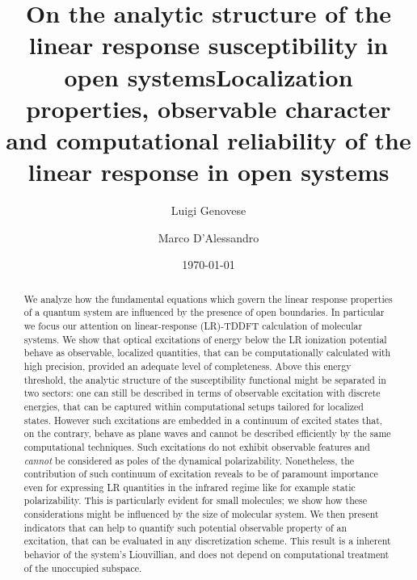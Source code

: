 \documentclass[reprint,aps,prb]{revtex4-1}
\begin{document}

\title{On the analytic structure of the linear response susceptibility in open systems}
\title{Localization properties, observable character and computational reliability of the linear response in open systems}

\author{Luigi Genovese}
\author{Marco D'Alessandro}%

\date{\today}

\begin{abstract}
We analyze how the fundamental equations which govern the linear response properties of a quantum system are influenced by the presence of open boundaries.
In particular we focus our attention on linear-response (LR)-TDDFT calculation of molecular systems. We show that optical excitations of energy below the LR ionization potential 
behave as observable, localized quantities, that can be computationally calculated with high precision, provided an adequate level of completeness.
Above this energy threshold, the analytic structure of the susceptibility functional might be separated in two sectors: one can still be described in terms of observable excitation 
with discrete energies, that can be captured within computational setups tailored for localized states. However such excitations are embedded in a continuum of excited states 
that, on the contrary, behave as plane waves and cannot be described efficiently by the same computational techniques. Such excitations do not exhibit observable features and 
\emph{cannot} be considered as poles of the dynamical polarizability. Nonetheless, the contribution of such continuum of excitation reveals to be of paramount importance even 
for expressing LR quantities in the infrared regime like for example static polarizability.
This is particularly evident for small molecules; we show how these considerations might be influenced by the size of molecular system.
We then present indicators that can help to quantify such potential observable property of an excitation, that can be evaluated 
in any discretization scheme.  This result is a inherent behavior of the system's Liouvillian, and does not depend on computational treatment of the 
unoccupied subspace.
\end{abstract}

\maketitle
\end{document}
